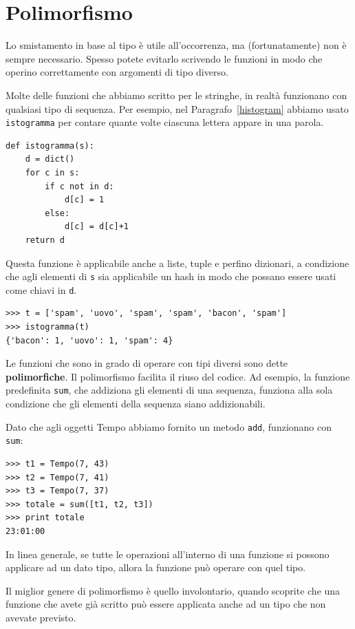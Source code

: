\documentclass[10pt]{book}
\begin{document}
\section{Polimorfismo}

Lo smistamento in base al tipo è utile all'occorrenza, ma (fortunatamente) non è sempre necessario. Spesso potete evitarlo scrivendo le funzioni in modo che operino correttamente con argomenti di tipo diverso.


Molte delle funzioni che abbiamo scritto per le stringhe, in realtà funzionano con qualsiasi tipo di sequenza.
Per esempio, nel Paragrafo~\ref{histogram}
abbiamo usato {\tt istogramma} per contare quante volte ciascuna lettera appare in una parola.

\begin{verbatim}
def istogramma(s):
    d = dict()
    for c in s:
        if c not in d:
            d[c] = 1
        else:
            d[c] = d[c]+1
    return d
\end{verbatim}
%
Questa funzione è applicabile anche a liste, tuple e perfino dizionari, a condizione che agli elementi di {\tt s} sia applicabile un hash in modo che possano essere usati come chiavi in {\tt d}.

\begin{verbatim}
>>> t = ['spam', 'uovo', 'spam', 'spam', 'bacon', 'spam']
>>> istogramma(t)
{'bacon': 1, 'uovo': 1, 'spam': 4}
\end{verbatim}
%
Le funzioni che sono in grado di operare con tipi diversi sono dette {\bf polimorfiche}.
Il polimorfismo facilita il riuso del codice.  Ad esempio, la funzione predefinita {\tt sum}, che addiziona gli elementi di una sequenza, funziona alla sola condizione che gli elementi della sequenza siano addizionabili.

Dato che agli oggetti Tempo abbiamo fornito un metodo {\tt add}, funzionano con
{\tt sum}:

\begin{verbatim}
>>> t1 = Tempo(7, 43)
>>> t2 = Tempo(7, 41)
>>> t3 = Tempo(7, 37)
>>> totale = sum([t1, t2, t3])
>>> print totale
23:01:00
\end{verbatim}
%
In linea generale, se tutte le operazioni all'interno di una funzione si possono applicare ad un dato tipo, allora la funzione può operare con quel tipo.

Il miglior genere di polimorfismo è quello involontario, quando scoprite che una funzione che avete già scritto può essere applicata anche ad un tipo che non avevate previsto.
\end{document}
